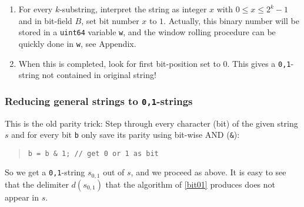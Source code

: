 \documentclass[12pt, a4paper]{amsart}
\begin{document}
\begin{enumerate}
\vspace*{2mm}

\item For every $k$-substring, interpret the string as integer $x$
with $0 \leq x \leq 2^k - 1$ and in bit-field $B$, 
set bit number $x$ to $1$. Actually, this binary number will be 
stored in a {\tt uint64} variable {\tt w}, and the window rolling procedure 
can be quickly done in {\tt w}, see Appendix.
\item When this is completed, look for first bit-position set to $0$.
This gives a {\tt 0,1}-string not contained in original string!

\end{enumerate}
\subsubsection{Reducing general strings to {\tt 0,1}-strings}
This is the old parity trick: Step through every character (bit) of 
the given string $s$ and for every bit {\tt b} only save its parity
using bit-wise AND ({\tt \&}):
\begin{quote}
{\tt b = b \& 1;  // get 0 or 1 as bit}
\end{quote}
So we get a {\tt 0,1}-string $s_{0,1}$ out of $s$, and we proceed as above.
It is easy to see that the delimiter $d(s_{0,1})$ that the algorithm 
of \ref{bit01} produces does not appear in $s$.
\end{document}
